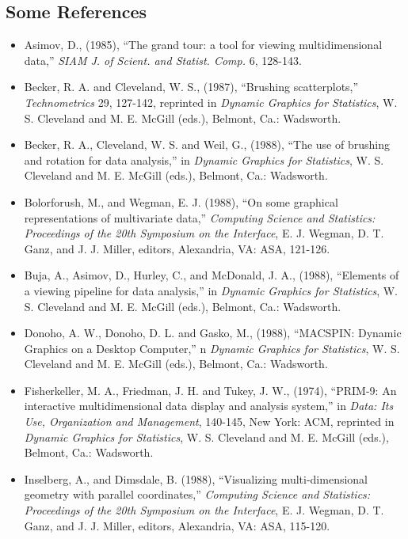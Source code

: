 \begin{slide}{}
\subsection{Some References}
\normalsize
\begin{itemize}
\item[]
{\sc Asimov, D.}, (1985), ``The grand tour: a tool for viewing
multidimensional data,'' {\em SIAM J. of Scient. and Statist.
Comp.} 6, 128-143.
\item[]
{\sc Becker, R. A. and Cleveland, W. S.}, (1987), ``Brushing scatterplots,''
{\em Technometrics} 29, 127-142, reprinted in {\em Dynamic Graphics
for Statistics}, W. S. Cleveland and M. E. McGill (eds.), Belmont,
Ca.: Wadsworth.
\item[]
{\sc Becker, R. A., Cleveland, W. S. and Weil, G.}, (1988), ``The use of
brushing and rotation for data analysis,'' in {\em Dynamic Graphics
for Statistics}, W. S. Cleveland and M. E. McGill (eds.), Belmont,
Ca.: Wadsworth.
\item[]
{\sc Bolorforush, M., and Wegman, E. J.} (1988), ``On some graphical
representations of multivariate data,'' {\em Computing Science and
Statistics: Proceedings of the 20th Symposium on the Interface}, E. J.
Wegman, D. T. Ganz, and J. J. Miller, editors, Alexandria, VA: ASA, 121-126.
\item[]
{\sc Buja, A., Asimov, D., Hurley, C., and McDonald, J. A.}, (1988),
``Elements of a viewing pipeline for data analysis,'' in {\em Dynamic
Graphics for Statistics}, W. S. Cleveland and M. E. McGill (eds.),
Belmont, Ca.: Wadsworth.
\item[]
{\sc Donoho, A. W., Donoho, D. L. and Gasko, M.}, (1988), ``MACSPIN:
Dynamic Graphics on a Desktop Computer,'' n {\em Dynamic
Graphics for Statistics}, W. S. Cleveland and M. E. McGill (eds.),
Belmont, Ca.: Wadsworth.
\item[]
{\sc Fisherkeller, M. A., Friedman, J. H. and Tukey, J. W.},  (1974),
``PRIM-9: An interactive multidimensional data display and analysis
system,'' in {\em Data: Its Use, Organization and Management},
140-145, New York: ACM, reprinted in {\em Dynamic
Graphics for Statistics}, W. S. Cleveland and M. E. McGill (eds.),
Belmont, Ca.: Wadsworth.
\item[]
{\sc Inselberg, A., and Dimsdale, B.} (1988), ``Visualizing
multi-di\-mensional geometry with parallel coordinates,'' {\em Computing
Science and Statistics: Proceedings of the 20th Symposium on the
Interface}, E. J. Wegman, D. T. Ganz, and J. J. Miller, editors,
Alexandria, VA: ASA, 115-120.
\end{itemize}
\end{slide}

